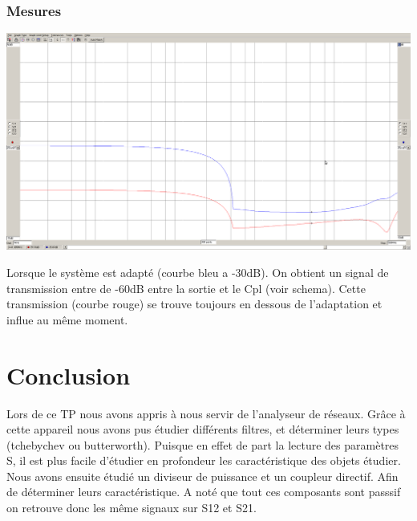 \documentclass[a4paper,12pt]{report}            %
\begin{document}
\subsection{Mesures}
\begin{center}\includegraphics[scale = 0.25]{pic/cdop.png} \\\end{center}
Lorsque le système est adapté (courbe bleu a -30dB). On obtient un signal de transmission entre 
de -60dB entre la sortie et le Cpl (voir schema). Cette transmission (courbe rouge) se trouve 
toujours en dessous de l'adaptation et influe au même moment. 
\chapter{Conclusion}
Lors de ce TP nous avons appris à nous servir de l'analyseur de réseaux. Grâce à cette appareil
nous avons pus étudier différents filtres, et déterminer leurs types (tchebychev ou butterworth). 
Puisque en effet de part la lecture des paramètres S, il est plus facile d'étudier en profondeur les 
caractéristique des objets étudier.
Nous avons ensuite étudié un diviseur de puissance et un coupleur directif. Afin de déterminer leurs
caractéristique.
A noté que tout ces composants sont passsif on retrouve donc les même signaux sur S12 et S21.
\end{document}
